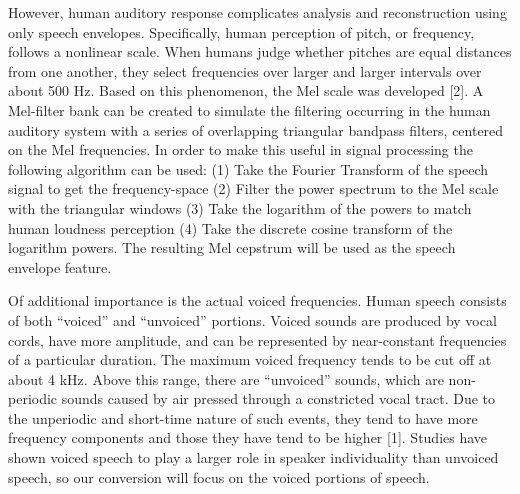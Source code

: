 \documentclass{article}
\begin{document}
However, human auditory response complicates analysis and reconstruction using only speech envelopes. Specifically, human perception of pitch, or frequency, follows a nonlinear scale. When humans judge whether pitches are equal distances from one another, they select frequencies over larger and larger intervals over about 500 Hz. Based on this phenomenon, the Mel scale was developed [2]. A Mel-filter bank can be created to simulate the filtering occurring in the human auditory system with a series of overlapping triangular bandpass filters, centered on the Mel frequencies. In order to make this useful in signal processing the following algorithm can be used:
(1)  Take the Fourier Transform of the speech signal to get the frequency-space
(2)  Filter the power spectrum to the Mel scale with the triangular windows
(3)  Take the logarithm of the powers to match human loudness perception
(4)  Take the discrete cosine transform of the logarithm powers.
 The resulting Mel cepstrum will be used as the speech envelope feature.
 
Of additional importance is the actual voiced frequencies. Human speech consists of both ``voiced'' and ``unvoiced'' portions. Voiced sounds are produced by vocal cords, have more amplitude, and can be represented by near-constant frequencies of a particular duration. The maximum voiced frequency tends to be cut off at about 4 kHz. Above this range, there are ``unvoiced'' sounds, which are non-periodic sounds caused by air pressed through a constricted vocal tract. Due to the unperiodic and short-time nature of such events, they tend to have more frequency components and those they have tend to be higher [1]. Studies have shown voiced speech to play a larger role in speaker individuality than unvoiced speech, so our conversion will focus on the voiced portions of speech.
\end{document}
